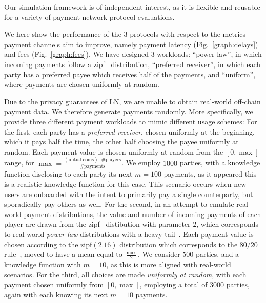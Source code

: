   Our simulation framework is of independent interest, as it is flexible
  and reusable for a variety of payment network protocol evaluations.

  We here
  show the performance of the $3$ protocols with respect to the metrics payment
  channels aim to improve, namely payment latency (Fig.~\ref{graph:delays}) and
  fees (Fig.~\ref{graph:fees}). We have designed 3 workloads: ``power law'', in
  which incoming payments follow a zipf~\cite{powers-1998-applications}
  distribution, ``preferred receiver'', in which each party has a preferred
  payee which receives half of the payments, and ``uniform'', where payments are
  chosen uniformly at random.

  Due to the privacy guarantees of LN, we are unable to obtain real-world
  off-chain payment data. We therefore generate payments randomly. More
  specifically, we provide three different payment workloads to mimic
  different usage schemes: For the first, each party has a \emph{preferred
  receiver}, chosen
  uniformly at the beginning, which it pays half the time, the other half
  choosing the payee uniformly at random. Each payment value is chosen
  uniformly at random from the $[0, \max]$ range, for $\max =
  \frac{(\text{initial coins}) \cdot \text{\#players}}{\text{\#payments}}$. We
  employ $1000$ parties, with a knowledge function disclosing to each party its
  next $m=100$ payments, as it appeared this is a realistic knowledge function
  for this case. This scenario occurs when new users are onboarded with
  the intent to primarily pay a single counterparty, but sporadically pay
  others as well. For the second, in an attempt to emulate real-world payment
  distributions, the value and number of incoming payments of each player are
  drawn from the zipf~\cite{powers-1998-applications} distibution with
  parameter $2$, which corresponds to real-world \emph{power-law} distributions
  with a heavy tail~\cite{DBLP:journals/cn/BroderKMRRSTW00}. Each payment value
  is chosen according to the
  zipf$(2.16)$ distribution which corresponds to the $80/20$
  rule~\cite{pareto}, moved to have a mean equal to $\frac{\max}{2}$. We
  consider $500$ parties, and a knowledge function with $m=10$, as this is more
  aligned with real-world scenarios. For the third, all choices are made
  \emph{uniformly at random}, with each payment chosen uniformly from $[0,
  \max]$, employing a
  total of $3000$ parties, again with each knowing its next $m=10$ payments.

